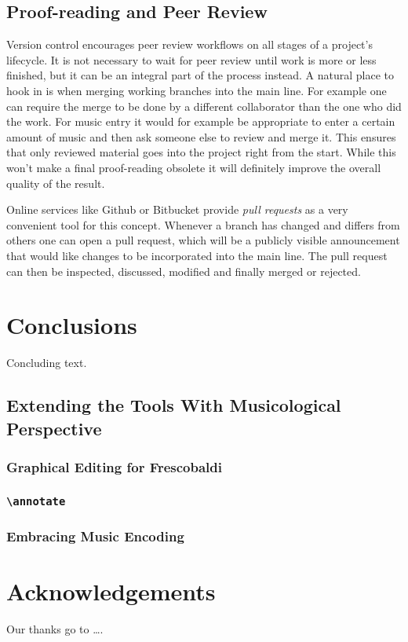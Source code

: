 \documentclass[11pt,a4paper]{article}
\begin{document}
\subsection{Proof-reading and Peer Review}
Version control encourages peer review workflows on all stages of a project's lifecycle.
It is not necessary to wait for peer review until work is more or less finished, but it can be an integral part of the process instead. A natural place to hook in is when merging
working branches into the main line. For example one can require the merge to be done by
a different collaborator than the one who did the work. For music entry it would for
example be appropriate to enter a certain amount of music and then ask someone else
to review and merge it.
This ensures that only reviewed material goes into the project right from the
start. While this won't make a final proof-reading obsolete it will definitely improve
the overall quality of the result.

Online services like Github or Bitbucket provide \emph{pull requests} as a very convenient
tool for this concept. Whenever a branch has changed and differs from others one can
open a pull request, which will be a publicly visible announcement that would like changes
to be incorporated into the main line. The pull request can then be inspected, discussed,
modified and finally merged or rejected.


\section{Conclusions}\label{sec:conclusions}

Concluding text.


\subsection{Extending the Tools With Musicological Perspective}

\subsubsection{Graphical Editing for Frescobaldi}

\subsubsection{\texttt{\textbackslash annotate}}

\subsubsection{Embracing Music Encoding}



\section{Acknowledgements}

Our thanks go to \ldots .
\end{document}

